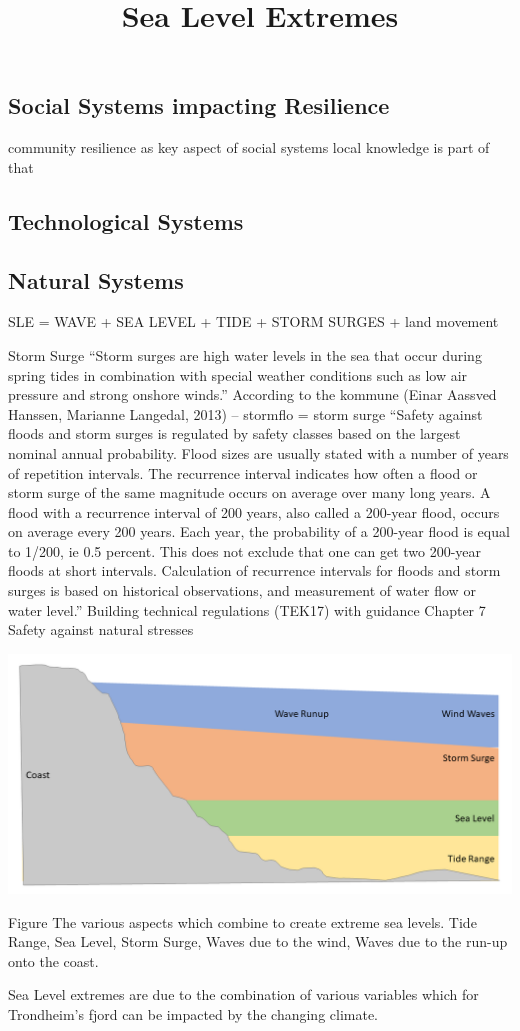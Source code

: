 \documentclass{article}
\begin{document}
\subsection{Social Systems impacting Resilience}
community resilience as key aspect of social systems
local knowledge is part of that

\subsection{Technological Systems}

\subsection{Natural Systems }
SLE = WAVE + SEA LEVEL + TIDE + STORM SURGES + land movement

Storm Surge
“Storm surges are high water levels in the sea that occur during spring tides in combination with special weather conditions such as low air pressure and strong onshore winds.” According to the kommune (Einar Aassved Hanssen, Marianne Langedal, 2013) – stormflo = storm surge
“Safety against floods and storm surges is regulated by safety classes based on the
largest nominal annual probability. Flood sizes are usually stated with a number of
years of repetition intervals. The recurrence interval indicates how often a flood or
storm surge of the same magnitude occurs on average over many long years. A flood
with a recurrence interval of 200 years, also called a 200-year flood, occurs on average
every 200 years. Each year, the probability of a 200-year flood is equal to 1/200, ie 0.5 percent.
This does not exclude that one can get two 200-year floods at short intervals.
Calculation of recurrence intervals for floods and storm surges is based on historical
observations, and measurement of water flow or water level.”
Building technical regulations (TEK17) with guidance Chapter 7 Safety against natural stresses

\title{Sea Level Extremes}
\includegraphics[width=1\textwidth]{fig_theory/sea level extremes.png}

\begin{frame}{Figure The various aspects which combine to create extreme sea levels. Tide Range, Sea Level, Storm Surge, Waves due to the wind, Waves due to the run-up onto the coast.}

Sea Level extremes are due to the combination of various variables which for Trondheim's fjord can be impacted by the changing climate. 

\end{frame}
\end{document}
